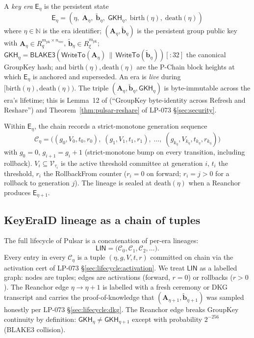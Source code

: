 \begin{definition}
\label{def:key-era}
A \emph{key era} $\mathsf{E}_\eta$ is the persistent state
\[
  \mathsf{E}_\eta
  = (\eta,\; \mathbf{A}_\eta,\; \tilde{\mathbf{b}}_\eta,\;
     \mathsf{GKH}_\eta,\; \mathrm{birth}(\eta),\; \mathrm{death}(\eta))
\]
where $\eta \in \mathbb{N}$ is the era identifier;
$(\mathbf{A}_\eta, \tilde{\mathbf{b}}_\eta)$ is the persistent group
public key with $\mathbf{A}_\eta \in R_q^{m_{\mathrm{pk}} \times
n_{\mathrm{vec}}}$, $\tilde{\mathbf{b}}_\eta \in R_\xi^{m_{\mathrm{pk}}}$;
$\mathsf{GKH}_\eta = \mathsf{BLAKE3}(\mathsf{WriteTo}(\mathbf{A}_\eta)
\,\|\, \mathsf{WriteTo}(\tilde{\mathbf{b}}_\eta))[:32]$ the canonical
GroupKey hash; and $\mathrm{birth}(\eta), \mathrm{death}(\eta)$ are the
P-Chain block heights at which $\mathsf{E}_\eta$ is anchored and
superseded. An era is \emph{live} during $[\mathrm{birth}(\eta),
\mathrm{death}(\eta))$. The triple $(\mathbf{A}_\eta,
\tilde{\mathbf{b}}_\eta, \mathsf{GKH}_\eta)$ is byte-immutable across
the era's lifetime; this is Lemma~12 of \cite{quasarcertsoundness}
(``GroupKey byte-identity across Refresh and Reshare'') and
Theorem~\ref{thm:pulsar-reshare} of LP-073 \S\ref{sec:security}.
\end{definition}

\begin{definition}
\label{def:gen-lineage}
Within $\mathsf{E}_\eta$, the chain records a strict-monotone
generation sequence
\[
  \mathcal{C}_\eta = \bigl(
    (g_0, V_0, t_0, r_0),\;
    (g_1, V_1, t_1, r_1),\;
    \ldots,\;
    (g_{k_\eta}, V_{k_\eta}, t_{k_\eta}, r_{k_\eta})
  \bigr)
\]
with $g_0 = 0$, $g_{i+1} = g_i + 1$ (strict-monotone bump on every
transition, including rollback). $V_i \subseteq \mathcal{V}_{\tau_i}$
is the active threshold committee at generation $i$, $t_i$ the
threshold, $r_i$ the RollbackFrom counter ($r_i = 0$ on forward;
$r_i = j > 0$ for a rollback to generation $j$). The lineage is
sealed at $\mathrm{death}(\eta)$ when a Reanchor produces
$\mathsf{E}_{\eta + 1}$.
\end{definition}

\subsection{KeyEraID lineage as a chain of tuples}
\label{sec:formal-model:lineage-chain}

The full lifecycle of Pulsar is a concatenation of per-era lineages:
\[
  \mathsf{LIN} = \bigl( \mathcal{C}_0, \mathcal{C}_1, \mathcal{C}_2,
                       \ldots \bigr).
\]
Every entry in every $\mathcal{C}_\eta$ is a tuple
$(\eta, g, V, t, r)$ committed on chain via the activation cert of
LP-073 \S\ref{sec:lifecycle:activation}. We treat $\mathsf{LIN}$ as a
labelled graph: nodes are tuples; edges are activations
(forward, $r = 0$) or rollbacks ($r > 0$). The Reanchor edge $\eta \to
\eta + 1$ is labelled with a fresh ceremony or DKG transcript and
carries the proof-of-knowledge that
$(\mathbf{A}_{\eta+1}, \tilde{\mathbf{b}}_{\eta+1})$ was sampled
honestly per LP-073 \S\ref{sec:lifecycle:dkg}. The Reanchor edge breaks
GroupKey continuity by definition: $\mathsf{GKH}_\eta \neq
\mathsf{GKH}_{\eta+1}$ except with probability $2^{-256}$
(BLAKE3 collision).

